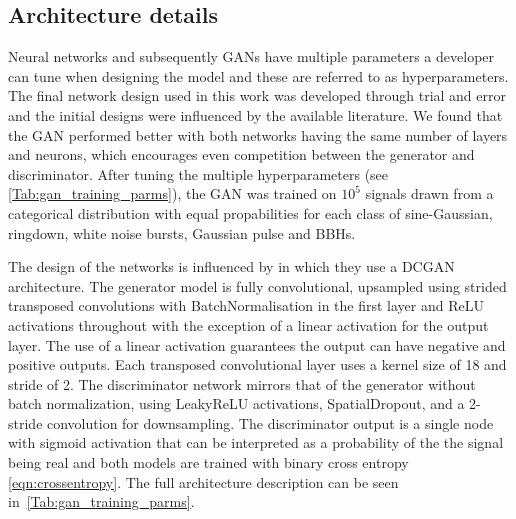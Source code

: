 \documentclass[12pt]{iopart}
\begin{document}
\subsection{Architecture details}
%
%
%
Neural networks and subsequently \acp{GAN} have multiple parameters a developer
can tune when designing the model and these are referred to as hyperparameters.
The final network design used in this work was developed through trial and
error and the initial designs were influenced by the available literature. We found
that the \ac{GAN} performed better with both networks having the same number of
layers and neurons, which encourages even
competition between the generator and discriminator.  After tuning the multiple
hyperparameters (see \cref{Tab:gan_training_parms}), the \ac{GAN} was trained on
$10^5$ signals  drawn from a categorical
distribution with equal propabilities for each class of
sine-Gaussian,
ringdown, white noise bursts, Gaussian pulse and \acp{BBH}.

The design of the networks is influenced by \cite{Radford2015} in which they use a \ac{DCGAN} architecture. The generator model is fully convolutional, upsampled using strided transposed convolutions with BatchNormalisation in the first layer and ReLU activations throughout with the exception of a linear activation for the output layer. The use of a linear activation guarantees the output can have negative and positive outputs. Each transposed convolutional layer uses a kernel size of 18 and stride of 2. The discriminator network mirrors that of the generator without batch normalization, using LeakyReLU activations, SpatialDropout, and a 2-stride convolution for downsampling. The discriminator output is a single node with sigmoid activation that can be interpreted as a probability of the the signal being real and both models are trained with binary cross entropy \cref{eqn:crossentropy}. The full architecture description can be seen in~\cref{Tab:gan_training_parms}.
\end{document}
